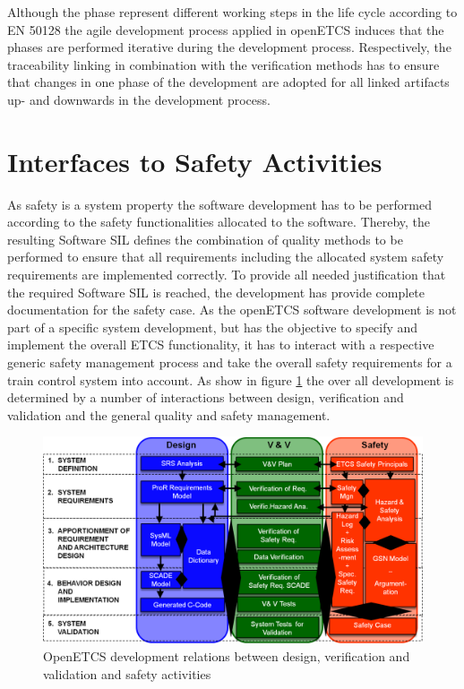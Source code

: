 \documentclass{template/openetcs_report}
\begin{document}
Although the phase represent different working steps in the life cycle according to EN 50128 the agile development process applied in openETCS induces that the phases are performed iterative during the development process. Respectively, the traceability linking in combination with the verification methods has to ensure that changes in one phase of the development are adopted for all linked artifacts up- and downwards in the development process.

\section{Interfaces to Safety Activities}

As safety is a system property the software development has to be performed according to the safety functionalities allocated to the software. Thereby, the resulting Software SIL defines the combination of quality methods to be performed to ensure that all requirements including the allocated system safety requirements are implemented correctly. To provide all needed justification that the required Software SIL is reached, the development has provide complete documentation for the safety case. As the openETCS software development is not part of a specific system development, but has the objective to specify and implement the overall ETCS functionality, it has to interact with a respective generic safety management process and take the overall safety requirements for a train control system into account. As show in figure \ref{fig:SafetyProcess} the over all development is determined by a number of interactions between design, verification and validation and the general quality and safety management.

\begin{figure}[htbp]
\centering
\includegraphics[width=1\linewidth]{./images/openETCS-Software-Safety-Development}
\caption{OpenETCS development relations between design, verification and validation and safety activities}
\label{fig:SafetyProcess}
\end{figure}
\end{document}
